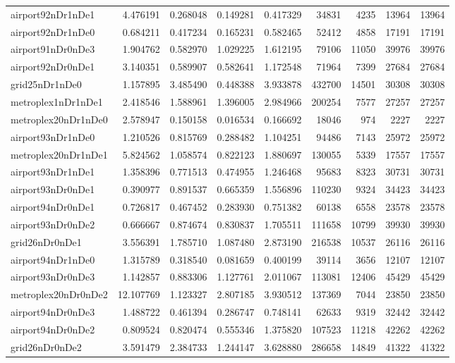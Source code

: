 \begin{longtable}{|l|r|r|r|r|r|r|r|r|}
airport92nDr1nDe1 & 4.476191 & 0.268048 & 0.149281 & 0.417329 & 34831 & 4235 & 13964 & 13964 \\
airport92nDr1nDe0 & 0.684211 & 0.417234 & 0.165231 & 0.582465 & 52412 & 4858 & 17191 & 17191 \\
airport91nDr0nDe3 & 1.904762 & 0.582970 & 1.029225 & 1.612195 & 79106 & 11050 & 39976 & 39976 \\
airport92nDr0nDe1 & 3.140351 & 0.589907 & 0.582641 & 1.172548 & 71964 & 7399 & 27684 & 27684 \\
grid25nDr1nDe0 & 1.157895 & 3.485490 & 0.448388 & 3.933878 & 432700 & 14501 & 30308 & 30308 \\
metroplex1nDr1nDe1 & 2.418546 & 1.588961 & 1.396005 & 2.984966 & 200254 & 7577 & 27257 & 27257 \\
metroplex20nDr1nDe0 & 2.578947 & 0.150158 & 0.016534 & 0.166692 & 18046 & 974 & 2227 & 2227 \\
airport93nDr1nDe0 & 1.210526 & 0.815769 & 0.288482 & 1.104251 & 94486 & 7143 & 25972 & 25972 \\
metroplex20nDr1nDe1 & 5.824562 & 1.058574 & 0.822123 & 1.880697 & 130055 & 5339 & 17557 & 17557 \\
airport93nDr1nDe1 & 1.358396 & 0.771513 & 0.474955 & 1.246468 & 95683 & 8323 & 30731 & 30731 \\
airport93nDr0nDe1 & 0.390977 & 0.891537 & 0.665359 & 1.556896 & 110230 & 9324 & 34423 & 34423 \\
airport94nDr0nDe1 & 0.726817 & 0.467452 & 0.283930 & 0.751382 & 60138 & 6558 & 23578 & 23578 \\
airport93nDr0nDe2 & 0.666667 & 0.874674 & 0.830837 & 1.705511 & 111658 & 10799 & 39930 & 39930 \\
grid26nDr0nDe1 & 3.556391 & 1.785710 & 1.087480 & 2.873190 & 216538 & 10537 & 26116 & 26116 \\
airport94nDr1nDe0 & 1.315789 & 0.318540 & 0.081659 & 0.400199 & 39114 & 3656 & 12107 & 12107 \\
airport93nDr0nDe3 & 1.142857 & 0.883306 & 1.127761 & 2.011067 & 113081 & 12406 & 45429 & 45429 \\
metroplex20nDr0nDe2 & 12.107769 & 1.123327 & 2.807185 & 3.930512 & 137369 & 7044 & 23850 & 23850 \\
airport94nDr0nDe3 & 1.488722 & 0.461394 & 0.286747 & 0.748141 & 62633 & 9319 & 32442 & 32442 \\
airport94nDr0nDe2 & 0.809524 & 0.820474 & 0.555346 & 1.375820 & 107523 & 11218 & 42262 & 42262 \\
grid26nDr0nDe2 & 3.591479 & 2.384733 & 1.244147 & 3.628880 & 286658 & 14849 & 41322 & 41322 \\

\end{longtable}
